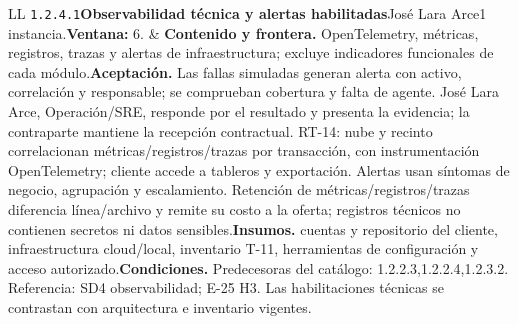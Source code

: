 \begin{longtable}{L{\tabcolsep\relax}L{\tabcolsep\relax}}
\texttt{1.\allowbreak{}2.\allowbreak{}4.\allowbreak{}1}\newline{}\textbf{Observabilidad técnica y alertas habilitadas}\newline{}José Lara Arce\newline{}1 instancia.\newline{}\textbf{Ventana:} 6. & \textbf{Contenido y frontera.} OpenTelemetry, métricas, registros, trazas y alertas de infraestructura; excluye indicadores funcionales de cada módulo.\newline{}\textbf{Aceptación.} Las fallas simuladas generan alerta con activo, correlación y responsable; se comprueban cobertura y falta de agente. José Lara Arce, Operación/SRE, responde por el resultado y presenta la evidencia; la contraparte mantiene la recepción contractual. RT-14: nube y recinto correlacionan métricas/registros/trazas por transacción, con instrumentación OpenTelemetry; cliente accede a tableros y exportación. Alertas usan síntomas de negocio, agrupación y escalamiento. Retención de métricas/registros/trazas diferencia línea/archivo y remite su costo a la oferta; registros técnicos no contienen secretos ni datos sensibles.\newline{}\textbf{Insumos.} cuentas y repositorio del cliente, infraestructura cloud/local, inventario T-11, herramientas de configuración y acceso autorizado.\newline{}\textbf{Condiciones.} Predecesoras del catálogo: 1.2.2.3,1.2.2.4,1.2.3.2. Referencia: SD4 observabilidad; E-25 H3. Las habilitaciones técnicas se contrastan con arquitectura e inventario vigentes.\\\hline

\end{longtable}
